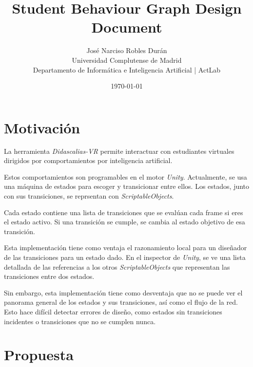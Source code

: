 \documentclass[10pt, a4paper]{article}
\begin{document}
\title{Student Behaviour Graph Design Document}
\author{
    {José Narciso Robles Durán} \\
    {Universidad Complutense de Madrid} \\
    {Departamento de Informática e Inteligencia Artificial | ActLab}
}
\date{\today}
\maketitle

\tableofcontents
\section{Motivación}
    La herramienta \textit{Didascalias-VR} permite interactuar con estudiantes virtuales dirigidos por comportamientos por inteligencia artificial.\par

    Estos comportamientos son programables en el motor \textit{Unity}. Actualmente, se usa una máquina de estados para escoger y transicionar entre ellos. Los estados, junto con sus transiciones, se reprsentan con \textit{ScriptableObjects}.\par

    Cada estado contiene una lista de transiciones que se evalúan cada frame si eres el estado activo. Si una transición se cumple, se cambia al estado objetivo de esa transición.\par

    Esta implementación tiene como ventaja el razonamiento local para un diseñador de las transiciones para un estado dado. En el inspector de \textit{Unity}, se ve una lista detallada de las referencias a los otros \textit{ScriptableObjects} que representan las transiciones entre dos estados.\par

    Sin embargo, esta implementación tiene como desventaja que no se puede ver el panorama general de los estados y sus transiciones, así como el flujo de la red. Esto hace difícil detectar errores de diseño, como estados sin transiciones incidentes o transiciones que no se cumplen nunca.\par

\section{Propuesta}
\end{document}
